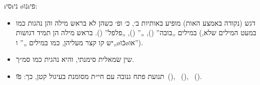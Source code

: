 \begin{framed}
\i{סי}\i{ני} \o{נו}\i{פי}:
\begin{itemize}
	\item דגש (נקודה באמצע האות) מופיע באותיות ב׳, כ׳ ופ׳ כשהן לא בראש מילה והן נהגות כמו במילים „בובה” (), „” (), „פלפל” (). בראש מילה הן תמיד דגושות (במעט המילים שלא, יש קו קצר מעליהן, כמו במילים „” ו„\o{כֿו}\o{או}”).
	\item שין שׂמאלית סימנתי, והיא נהגית כמו סמ״ך.
	\item תנועת פתח גנובה עם חי״ת מסומנת בעיגול קטן, כך: \u{פו}{\gnuvah}~(), ~(), ~().
\end{itemize}

\end{framed}

	





